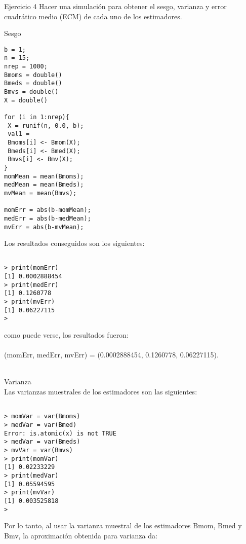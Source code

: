 



\begin{section}{Ejercicio 4}
Hacer una simulación para obtener el sesgo, varianza y error cuadrático medio (ECM) de
cada uno de los estimadores.

\begin{subsection}{Sesgo}~\\

\begin{verbatim}
b = 1;
n = 15;
nrep = 1000;
Bmoms = double()
Bmeds = double()
Bmvs = double()
X = double()

for (i in 1:nrep){
 X = runif(n, 0.0, b);
 val1 = 
 Bmoms[i] <- Bmom(X);
 Bmeds[i] <- Bmed(X);
 Bmvs[i] <- Bmv(X);
}
momMean = mean(Bmoms);
medMean = mean(Bmeds);
mvMean = mean(Bmvs);

momErr = abs(b-momMean);
medErr = abs(b-medMean);
mvErr = abs(b-mvMean);

\end{verbatim}
Los resultados conseguidos son los siguientes:

\begin{verbatim}

> print(momErr)
[1] 0.0002888454
> print(medErr)
[1] 0.1260778
> print(mvErr)
[1] 0.06227115
> 
\end{verbatim}
como puede verse, los resultados fueron:\\
~\\
 (momErr, medErr, mvErr) = (0.0002888454, 0.1260778, 0.06227115).\\
~\\
\end{subsection}
\begin{subsection}{Varianza}~\\

Las varianzas muestrales de los estimadores son las siguientes:


\begin{verbatim}

> momVar = var(Bmoms)
> medVar = var(Bmed)
Error: is.atomic(x) is not TRUE
> medVar = var(Bmeds)
> mvVar = var(Bmvs)
> print(momVar)
[1] 0.02233229
> print(medVar)
[1] 0.05594595
> print(mvVar)
[1] 0.003525818
> 

\end{verbatim}

Por lo tanto, al usar la varianza muestral de los estimadores  Bmom, Bmed y Bmv, la aproximación obtenida para varianza da: \\
~\\
~\\
~\\


\end{subsection}
\end{section}
